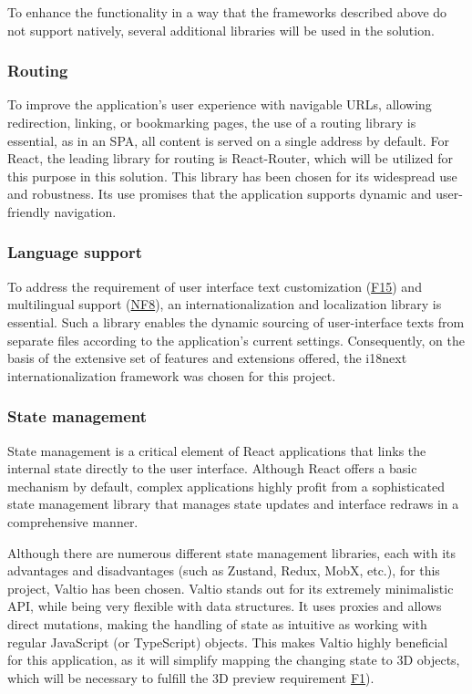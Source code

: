 To enhance the functionality in a way that the frameworks described above do not support natively, several additional libraries will be used in the solution.

\subsubsection{Routing}

To improve the application's user experience with navigable URLs, allowing redirection, linking, or bookmarking pages, the use of a routing library is essential, as in an SPA, all content is served on a single address by default. For React, the leading library for routing is React-Router, which will be utilized for this purpose in this solution. This library has been chosen for its widespread use and robustness. Its use promises that the application supports dynamic and user-friendly navigation. \cite{Ganatra2018}

\subsubsection{Language support}

To address the requirement of user interface text customization (\hyperref[itm:F15]{F15}) and multilingual support (\hyperref[itm:NF8]{NF8}), an internationalization and localization library is essential. Such a library enables the dynamic sourcing of user-interface texts from separate files according to the application's current settings. Consequently, on the basis of the extensive set of features and extensions offered, the i18next internationalization framework was chosen for this project. \cite{Krukowski2023}

\subsubsection{State management}

State management is a critical element of React applications that links the internal state directly to the user interface. Although React offers a basic mechanism by default, complex applications highly profit from a sophisticated state management library that manages state updates and interface redraws in a comprehensive manner. \cite{Ceddia2021}

Although there are numerous different state management libraries, each with its advantages and disadvantages (such as Zustand, Redux, MobX, etc.), for this project, Valtio has been chosen. Valtio stands out for its extremely minimalistic API, while being very flexible with data structures. It uses proxies and allows direct mutations, making the handling of state as intuitive as working with regular JavaScript (or TypeScript) objects. This makes Valtio highly beneficial for this application, as it will simplify mapping the changing state to 3D objects, which will be necessary to fulfill the 3D preview requirement \hyperref[itm:F1]{F1}). \cite{Adepoju2023}

